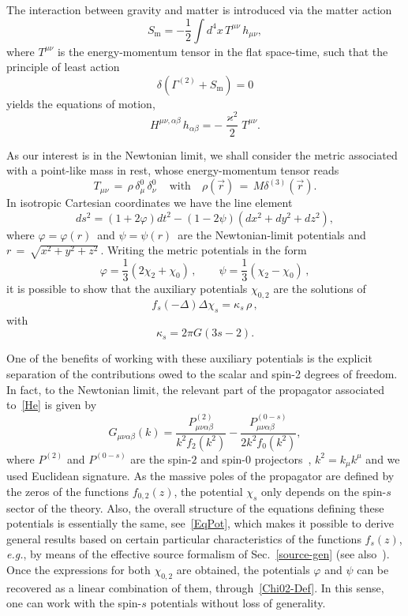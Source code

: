 \documentclass[aps,prd,a4paper,twocolumn,showpacs,showkeys,preprintnumbers,amsmath,amssymb,nofootinbib]{revtex4-2}
\numberwithin{equation}{section}
\def\beq{\begin{equation}}
\def\eeq{\end{equation}}
\newcommand{\n}[1]{\label{#1}}
\def\al{\alpha}
\def\be{\beta}
\def\Ga{\Gamma}
\def\de{\delta}
\def\ka{\kappa}
\def\ph{\varphi}
\def\lap{\Delta}
\begin{document}
The interaction between gravity and matter is introduced via the matter action
\beq
S_{\text{m}} = - \frac{1}{2 } \int d^4x \, T^{\mu\nu} \, h_{\mu\nu},
\eeq
where $T^{\mu\nu}$ is the energy-momentum tensor in the flat space-time, such that the principle of least action 
\beq
\de ( \Ga^{(2)} + S_{\text{m}}) = 0 
\eeq 
yields the equations of motion,
\beq
\label{EOM}
H^{\mu\nu,\al\be} \, h_{\al\be} = - \frac{\varkappa^2}{2}  T^{\mu\nu}.
\eeq

As our interest is in the Newtonian limit, we shall consider the metric associated with a point-like mass in rest, whose energy-momentum tensor reads 
\begin{equation}
\n{T}
T_{\mu\nu} \,=\, \rho \, \de_\mu^0 \, \de_\nu^0 \, 
\quad \text{with} \quad \rho( \vec{r} ) \, = \, M   \de^{(3)} ( \vec{r} ).
\end{equation}
In isotropic Cartesian coordinates we have the line element
%
\begin{equation} \label{Metric}
ds^2 =  (1+ 2 \ph) dt^2 - (1 - 2 \psi) (dx^2+dy^2+dz^2),
\end{equation}
where $\ph = \ph(r)\,$ and $\psi = \psi(r)\,$ are the Newtonian-limit
potentials and $r \,=\, \sqrt{x^2+y^2+z^2}\,$. Writing the metric potentials in the form
%
\beq
\label{Chi02-Def}
\ph = \frac{1}{3} (2 \chi_2 + \chi_0) \, , \qquad \psi = \frac{1}{3} (\chi_2 - \chi_0) \,  ,
\eeq
it is possible to show that the auxiliary potentials $\chi_{0,2}$ are the solutions of~\cite{BreTib1}
\beq
\label{EqPot}
f_s (-\lap) \lap \chi_s  =   \ka_s \, \rho %
\, ,
\eeq
with 
\beq
\ka_s = 2 \pi G \left(  3s - 2 \right) 
.
\eeq

One of the benefits of working with these auxiliary potentials is the explicit separation of the contributions owed to the scalar and spin-2 degrees of freedom. In fact, to the Newtonian limit, the relevant part  of the
propagator associated to~\eqref{He} is given by
%
\beq
\label{prop}
G_{\mu\nu\al\be} (k)
=
 \frac{P^{(2)}_{\mu\nu\al\be}}{ k^2 f_2(k^2)}
-  \frac{P^{(0-s)}_{\mu\nu\al\be} }{ 2 k^2 f_0(k^2)}
,
\eeq
where $P^{(2)}$ and $P^{(0-s)}$ are the spin-$2$ and spin-$0$ projectors~\cite{Barnes-Rivers}, $k^2 = k_\mu k^\mu$ and we used Euclidean signature. As the massive poles of the propagator are defined by the zeros of the functions $f_{0,2} (z)$, the potential $\chi_s$ only depends on the spin-$s$ sector of the theory. Also, the overall structure of the equations defining these potentials is essentially the same, see~\eqref{EqPot}, which makes it possible to derive general results based on certain particular characteristics of the functions $f_{s} (z)$, \textit{e.g.}, by means of the effective source formalism of Sec.~\ref{source-gen} (see also~\cite{BreTib2}). 
Once the expressions for both $\chi_{0,2}$ are obtained, the potentials $\ph$ and $\psi$ can be recovered as a linear combination of them, through~\eqref{Chi02-Def}. In this sense, one can work with the spin-$s$ potentials without loss of generality.
\end{document}
